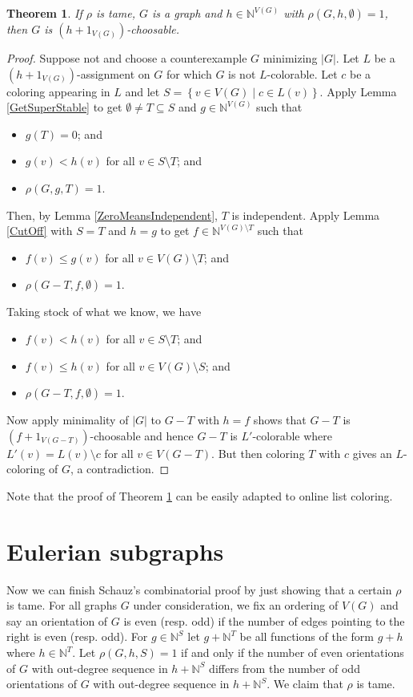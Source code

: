\documentclass[12pt]{article}
\theoremstyle{plain}
\newtheorem{thm}{Theorem}[section]
\theoremstyle{definition}
\theoremstyle{remark}
\newcommand{\IN}{\mathbb{N}}
\newcommand{\setb}[3]{\left\{ #1 \in #2 \mid #3 \right\}}
\newcommand{\card}[1]{\left|#1\right|}
\begin{document}
\begin{thm}\label{TameRhoWins}
	If $\rho$ is tame, $G$ is a graph and $h \in \IN^{V(G)}$ with $\rho(G, h, \emptyset) = 1$, then $G$ is $(h + 1_{V(G)})$-choosable.
\end{thm}
\begin{proof}
	Suppose not and choose a counterexample $G$ minimizing $\card{G}$.  Let $L$ be a $(h + 1_{V(G)})$-assignment on $G$ for which $G$ is not $L$-colorable.  Let $c$ be a coloring appearing in $L$ and let $S = \setb{v}{V(G)}{c \in L(v)}$.  Apply Lemma \ref{GetSuperStable} to get $\emptyset \ne T \subseteq S$ and $g \in \IN^{V(G)}$ such that
	\begin{itemize}
		\item $g(T) = 0$; and
		\item $g(v) < h(v)$ for all $v \in S\setminus T$; and
		\item $\rho(G, g, T) = 1$.
	\end{itemize}
	Then, by Lemma \ref{ZeroMeansIndependent}, $T$ is independent.  Apply Lemma \ref{CutOff} with $S = T$ and $h = g$ to get $f \in \IN^{V(G) \setminus T}$ such that
		\begin{itemize}
			\item $f(v) \le g(v)$ for all $v \in V(G) \setminus T$; and
			\item $\rho(G - T, f, \emptyset) = 1$.
		\end{itemize}
	Taking stock of what we know, we have
		\begin{itemize}
			\item $f(v) < h(v)$ for all $v \in S \setminus T$; and
			\item $f(v) \le h(v)$ for all $v \in V(G) \setminus S$; and
			\item $\rho(G - T, f, \emptyset) = 1$.
		\end{itemize}
		
	Now apply minimality of $|G|$ to $G-T$ with $h = f$ shows that $G-T$ is $(f + 1_{V(G-T)})$-choosable and hence $G-T$ is $L'$-colorable where $L'(v) = L(v) \setminus c$ for all $v \in V(G-T)$.  But then coloring $T$ with $c$ gives an $L$-coloring of $G$, a contradiction.
\end{proof}

Note that the proof of Theorem \ref{TameRhoWins} can be easily adapted to online list coloring.

\section{Eulerian subgraphs}
Now we can finish Schauz's combinatorial proof by just showing that a certain $\rho$ is tame.  For all graphs $G$ under consideration, we fix an ordering of $V(G)$ and say an orientation of $G$ is even (resp. odd) if the number of edges pointing to the right is even (resp. odd).  For $g \in \IN^S$ let $g + \IN^T$ be all functions of the form $g + h$ where $h \in \IN^T$. Let $\rho(G, h, S) = 1$ if and only if the number of even orientations of $G$ with out-degree sequence in $h + \IN^S$ differs from the number of odd orientations of $G$ with out-degree sequence in $h + \IN^S$.  We claim that $\rho$ is tame.  
\end{document}
